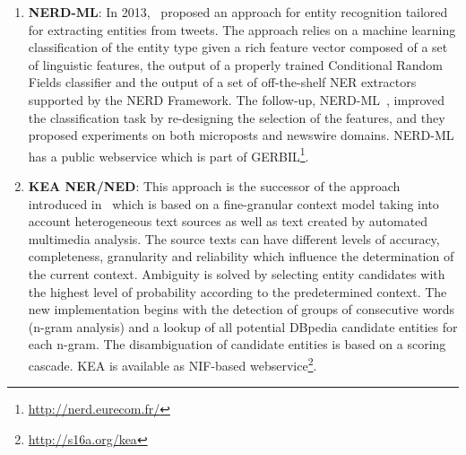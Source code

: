 \begin{enumerate}
\item \textbf{NERD-ML}: In 2013,~\cite{vanErp2013} proposed an approach for entity recognition tailored for extracting entities from tweets. The approach relies on a machine learning classification of the entity type given a rich feature vector composed of a set of linguistic features, the output of a properly trained Conditional Random Fields classifier and the output of a set of off-the-shelf NER extractors supported by the NERD Framework. The follow-up, NERD-ML~\cite{rizzo2014}, improved the classification task by re-designing the selection of the features, and they proposed experiments on both microposts and newswire domains.
NERD-ML has a public webservice which is part of GERBIL\footnote{\url{http://nerd.eurecom.fr/}}.


\item \textbf{KEA NER/NED}: This approach is the successor of the approach introduced in~\cite{Steinmetz2013} which is based on a fine-granular context model taking into account heterogeneous text sources %
as well as text created by automated multimedia analysis. %
The source texts can have different levels of accuracy, completeness, granularity and reliability which influence the determination of the current context. 
Ambiguity is solved by selecting entity candidates with the highest level of probability according to the predetermined context. 
The new implementation begins with the detection of groups of consecutive words (n-gram analysis) and a lookup of all potential DBpedia candidate entities for each n-gram. 
The disambiguation of candidate entities is based on a scoring cascade. %
KEA is available as NIF-based webservice\footnote{\url{http://s16a.org/kea}}.



\end{enumerate}
